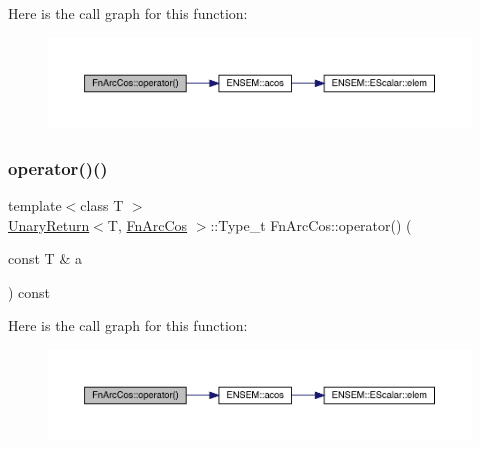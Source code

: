 Here is the call graph for this function\+:
\nopagebreak
\begin{figure}[H]
\begin{center}
\leavevmode
\includegraphics[width=350pt]{d1/d0b/structFnArcCos_a1485eed840820589bafab9b8cc21c43d_cgraph}
\end{center}
\end{figure}
\mbox{\label{structFnArcCos_a1485eed840820589bafab9b8cc21c43d}} 
\subsubsection{\texorpdfstring{operator()()}{operator()()}\hspace{0.1cm}{\footnotesize\ttfamily [2/3]}}
{\footnotesize\ttfamily template$<$class T $>$ \\
\mbox{\hyperlink{structUnaryReturn}{Unary\+Return}}$<$T, \mbox{\hyperlink{structFnArcCos}{Fn\+Arc\+Cos}} $>$\+::Type\+\_\+t Fn\+Arc\+Cos\+::operator() (\begin{DoxyParamCaption}\item[{const T \&}]{a }\end{DoxyParamCaption}) const\hspace{0.3cm}{\ttfamily [inline]}}

Here is the call graph for this function\+:
\nopagebreak
\begin{figure}[H]
\begin{center}
\leavevmode
\includegraphics[width=350pt]{d1/d0b/structFnArcCos_a1485eed840820589bafab9b8cc21c43d_cgraph}
\end{center}
\end{figure}
\mbox{\label{structFnArcCos_a1485eed840820589bafab9b8cc21c43d}} 
